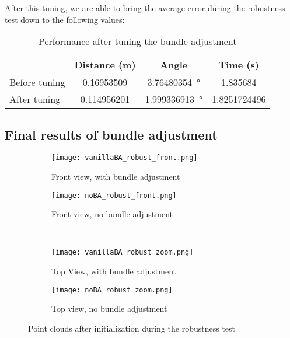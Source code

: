 After this tuning, we are able to bring the average error during the robustness test down to the following values:
\begin{table}[H]
  \centering
  \caption{Performance after tuning the bundle adjustment}
  \small\addtolength{\tabcolsep}{-2pt}
  \begin{tabular}{ @{} l S[table-format=2.2,round-precision=2] S[table-format=2.1,round-precision=1] S[table-format=2.3,round-precision=3] @{}  }

    \toprule
    {}      & {\scriptsize Distance (\si{\meter})} & {\scriptsize Angle} & {\scriptsize Time (\si{\second})} \\
    \midrule
    Before tuning  &\num{0.16953509}     &\SI{3.76480354}{\degree}     &\num{1.835684}  \\
    After tuning   &\num{0.114956201}    &\SI{1.999336913}{\degree}    &\num{1.8251724496}\\
    \bottomrule
  \end{tabular}
  \label{tab:batuning}
\end{table}

\subsection{Final results of bundle adjustment}

\begin{figure}[H] %
\centering
\begin{subfigure}{0.49\textwidth}
	\centering
  	\texttt{[image: vanillaBA\_robust\_front.png]}
	\caption{Front view, with bundle adjustment}
	\label{fig:ptcloud_ba}
\end{subfigure}
\begin{subfigure}{0.49\textwidth}
    \centering
	\texttt{[image: noBA\_robust\_front.png]}
	\caption{Front view, no bundle adjustment}
	\label{fig:ptcloud_noba}
\end{subfigure}\\

\begin{subfigure}{.49\textwidth}
  \centering
  \texttt{[image: vanillaBA\_robust\_zoom.png]}
  \caption{Top View, with bundle adjustment}
  \label{fig:ptcloud_vanillaBA_robust}
\end{subfigure}
\begin{subfigure}{.49\textwidth}
  \centering
  \texttt{[image: noBA\_robust\_zoom.png]}
  \caption{Top view, no bundle adjustment}
  \label{fig:ptcloud_noBA_robust}
\end{subfigure}%

\caption{Point clouds after initialization during the robustness test}
\label{fig:ptcloud}
\end{figure}

